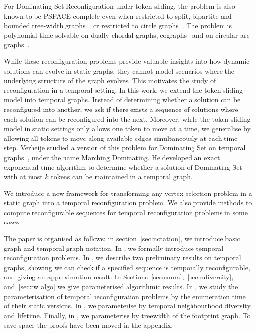 For {\sc Dominating Set Reconfiguration} under token sliding, the problem is also known to be PSPACE-complete even when  restricted to split, bipartite and bounded tree-width graphs~\cite{HaddadanIMNOST16}, or restricted to circle graphs~\cite{BousquetJ21}. The problem is polynomial-time solvable on dually chordal graphs, cographs~\cite{HaddadanIMNOST16} and on circular-arc graphs~\cite{BousquetJ21}.

%

While these reconfiguration problems provide valuable insights into how dynamic solutions can evolve in static graphs, they cannot model scenarios where the underlying structure of the graph evolves. This motivates the study of reconfiguration in a temporal setting.
%
    In this work, we extend the token sliding model into temporal graphs. Instead of determining whether a solution can be reconfigured into another, we ask if there exists a sequence of solutions where each solution can be reconfigured into the next. Moreover, while the token sliding model in static settings only allows one token to move at a time, we generalise by allowing all tokens to move along available edges simultaneously at each time-step. Verheije studied a version of this problem for {\sc Dominating Set} on temporal graphs~\cite{Verheije21}, under the name {\sc Marching Dominating}. He developed an exact exponential-time algorithm to determine whether a solution of {\sc Dominating Set} with at most $k$ tokens can be maintained in a temporal graph.

We introduce a new framework for transforming any vertex-selection problem in a static graph into a temporal reconfiguration problem. We also provide methods to compute reconfigurable sequences for temporal reconfiguration problems in some cases.


The paper is organised as follows: in section~\ref{sec:notation}, we introduce basic graph and temporal graph notation.  In , we formally introduce temporal reconfiguration problems. In , we describe two preliminary results on temporal graphs, showing we can check if a specified sequence is temporally reconfigurable, and giving an approximation result. In Sections~\ref{sec:enum},~\ref{sec:ndiversity}, and~\ref{sec:tw algo} we give parameterised algorithmic results. In , we study the parameterisation of temporal reconfiguration problems by the enumeration time of their static versions. In , we parameterise by temporal neighbourhood diversity and lifetime. Finally, in , we parameterise by treewidth of the footprint graph. To save space the proofs have been moved in the appendix.

